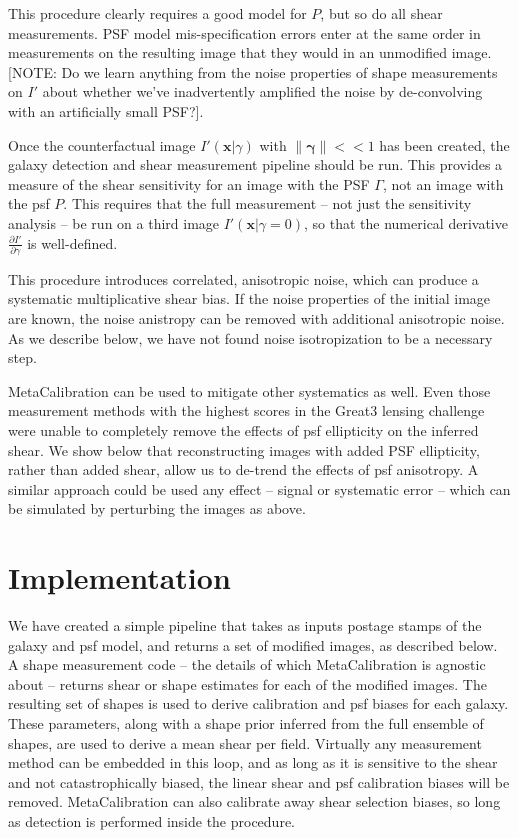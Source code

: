 \documentclass[iop]{emulateapj}
\begin{document}
This procedure clearly requires a good model for $P$, but so do all shear measurements. PSF model mis-specification errors enter at the same order in measurements on the resulting image that they would in an unmodified image. [NOTE: Do we learn anything from the noise properties of shape measurements on $I'$ about whether we've inadvertently amplified the noise by de-convolving with an artificially small PSF?].

Once the counterfactual image $I'(\mathbf{x}|\gamma)$ with $\|{\boldsymbol \gamma}\| << 1$ has been created, the galaxy detection and  shear measurement pipeline should be run. This provides a measure of the shear sensitivity for an image with the PSF $\Gamma$, not an image with the psf $P$. This requires that the full measurement -- not just the sensitivity analysis -- be run on a third image $I'(\mathbf{x}|\gamma=0)$, so that the numerical derivative $\frac{\partial I'}{\partial \gamma}$ is well-defined. 

This procedure introduces correlated, anisotropic noise, which can produce a systematic multiplicative shear bias. If the noise properties of the initial image are known, the noise anistropy can be removed with additional anisotropic noise. As we describe below, we have not found noise isotropization to be a necessary step.

MetaCalibration can be used to mitigate other systematics as well. Even those measurement methods with the highest scores in the Great3 lensing challenge were unable to completely remove the effects of psf ellipticity on the inferred shear. We show below that reconstructing images with added PSF ellipticity, rather than added shear, allow us to de-trend the effects of psf anisotropy. A similar approach could be used any effect -- signal or systematic error --  which can be simulated by perturbing the images as above.

\section{Implementation}
We have created a simple pipeline that takes as inputs postage stamps of the galaxy and psf model, and returns a set of modified images, as described below. A shape measurement code -- the details of which MetaCalibration is agnostic about -- returns shear or shape estimates for each of the modified images. The resulting set of shapes is used to derive calibration and psf biases for each galaxy. These parameters, along with a shape prior inferred from the full ensemble of shapes, are used to derive a mean shear per field. Virtually any measurement method can be embedded in this loop, and as long as it is sensitive to the shear and not catastrophically biased, the linear shear and psf calibration biases will be removed. MetaCalibration can also calibrate away shear selection biases, so long as detection is performed inside the procedure.
\end{document}
